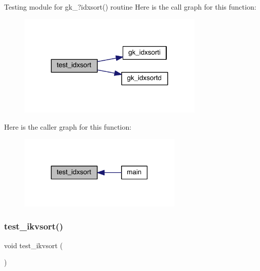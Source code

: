 Testing module for gk\+\_\+?idxsort() routine Here is the call graph for this function\+:\nopagebreak
\begin{figure}[H]
\begin{center}
\leavevmode
\includegraphics[width=252pt]{a00152_a3a4da1d3370fc7c176261dfc8eef5691_cgraph}
\end{center}
\end{figure}
Here is the caller graph for this function\+:\nopagebreak
\begin{figure}[H]
\begin{center}
\leavevmode
\includegraphics[width=222pt]{a00152_a3a4da1d3370fc7c176261dfc8eef5691_icgraph}
\end{center}
\end{figure}
\mbox{\label{a00152_a03d0ef2537e50ad38d65892cc9c28118}} 
\subsubsection{\texorpdfstring{test\+\_\+ikvsort()}{test\_ikvsort()}}
{\footnotesize\ttfamily void test\+\_\+ikvsort (\begin{DoxyParamCaption}{ }\end{DoxyParamCaption})}

